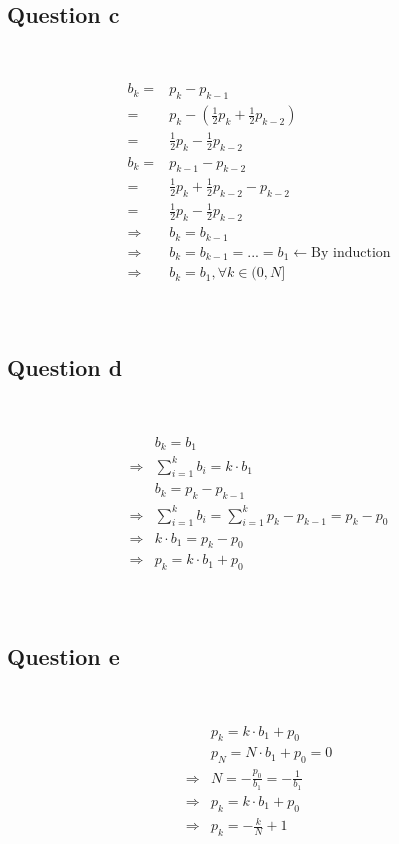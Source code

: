 \documentclass{article}
\begin{document}
~

\subsection*{Question c}

~

\begin{equation*}
    \begin{split}
        b_k=&p_k-p_{k-1}\\
        =&p_k-(\frac{1}{2}p_k+\frac{1}{2}p_{k-2})\\
        =&\frac{1}{2}p_k-\frac{1}{2}p_{k-2}\\
        b_{k}=&p_{k-1}-p_{k-2}\\
        =&\frac{1}{2}p_k+\frac{1}{2}p_{k-2}-p_{k-2}\\
        =&\frac{1}{2}p_k-\frac{1}{2}p_{k-2}\\
        \Rightarrow&b_k=b_{k-1}\\
        \Rightarrow&b_k=b_{k-1}=...=b_1\leftarrow\text{By induction}\\
        \Rightarrow&b_k=b_1,\forall k\in (0,N]\\
    \end{split}
\end{equation*}

~

\subsection*{Question d}

~

\begin{equation*}
    \begin{split}
        &b_k=b_1\\
        \Rightarrow&\sum_{i=1}^{k}b_i=k\cdot b_1\\
        &b_k=p_k-p_{k-1}\\
        \Rightarrow&\sum_{i=1}^{k}b_i=\sum_{i=1}^{k}p_k-p_{k-1}=p_k-p_0\\
        \Rightarrow&k\cdot b_1=p_k-p_0\\
        \Rightarrow&p_k=k\cdot b_1+p_0\\
    \end{split}
\end{equation*}

~

\subsection*{Question e}

~

\begin{equation*}
    \begin{split}
        &p_k=k\cdot b_1+p_0\\
        &p_N=N\cdot b_1+p_0=0\\
        \Rightarrow&N=-\frac{p_0}{b_1}=-\frac{1}{b_1}\\
        \Rightarrow&p_k=k\cdot b_1+p_0\\
        \Rightarrow&p_k=-\frac{k}{N}+1\\
    \end{split}
\end{equation*}
\end{document}
